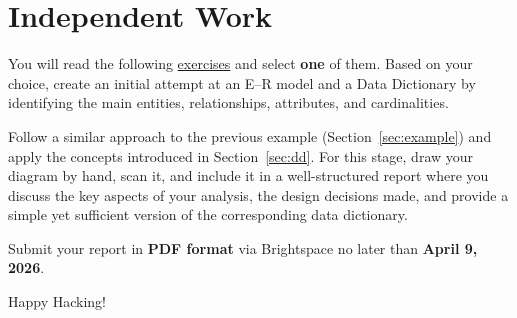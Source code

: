 \documentclass{article}
\begin{document}
\section{Independent Work}
You will read the following \href{https://drive.google.com/file/d/1TOvNSZZsybj1skLCpOxLtpr8b5A3Zb_6/view?usp=sharing}{exercises} and select \textbf{one} of them. Based on your choice, create an initial attempt at an E--R model and a Data Dictionary by identifying the main entities, relationships, attributes, and cardinalities.

Follow a similar approach to the previous example (Section~\ref{sec:example}) and apply the concepts introduced in Section~\ref{sec:dd}. For this stage, draw your diagram by hand, scan it, and include it in a well-structured report where you discuss the key aspects of your analysis, the design decisions made, and provide a simple yet sufficient version of the corresponding data dictionary.

Submit your report in \textbf{PDF format} via Brightspace\texttrademark{} no later than
\textbf{April 9, 2026}.


\vspace{5mm}
Happy Hacking! 
\end{document}
